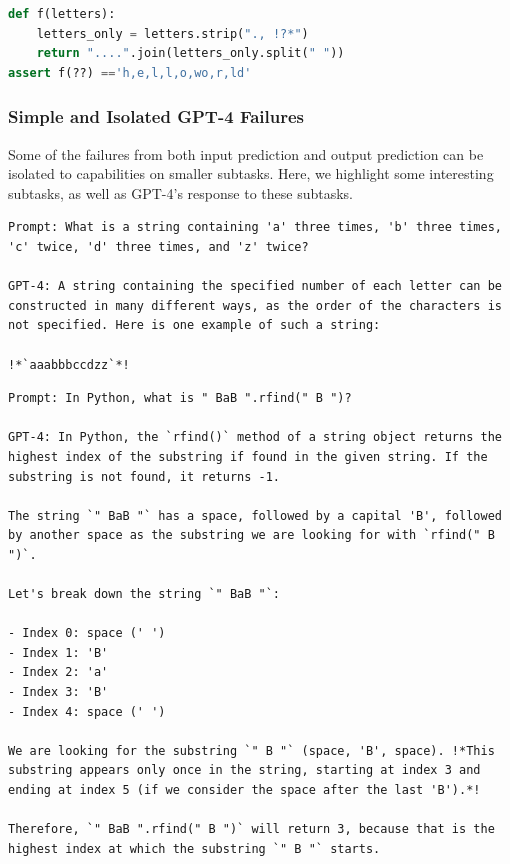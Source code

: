 \begin{lstlisting}[language=python]
def f(letters):
    letters_only = letters.strip("., !?*")
    return "....".join(letters_only.split(" "))
assert f(??) =='h,e,l,l,o,wo,r,ld'
\end{lstlisting}

\subsubsection{Simple and Isolated GPT-4 Failures} \label{appendix:simple-isolated-failures}
Some of the failures from both input prediction and output prediction can be isolated to capabilities on smaller subtasks. Here, we highlight some interesting subtasks, as well as GPT-4's response to these subtasks. 

\begin{lstlisting}
Prompt: What is a string containing 'a' three times, 'b' three times, 'c' twice, 'd' three times, and 'z' twice?

GPT-4: A string containing the specified number of each letter can be constructed in many different ways, as the order of the characters is not specified. Here is one example of such a string:

!*`aaabbbccdzz`*!
\end{lstlisting}

\begin{lstlisting}
Prompt: In Python, what is " BaB ".rfind(" B ")?

GPT-4: In Python, the `rfind()` method of a string object returns the highest index of the substring if found in the given string. If the substring is not found, it returns -1.

The string `" BaB "` has a space, followed by a capital 'B', followed by another space as the substring we are looking for with `rfind(" B ")`.

Let's break down the string `" BaB "`:

- Index 0: space (' ')
- Index 1: 'B'
- Index 2: 'a'
- Index 3: 'B'
- Index 4: space (' ')

We are looking for the substring `" B "` (space, 'B', space). !*This substring appears only once in the string, starting at index 3 and ending at index 5 (if we consider the space after the last 'B').*!

Therefore, `" BaB ".rfind(" B ")` will return 3, because that is the highest index at which the substring `" B "` starts.
\end{lstlisting}

